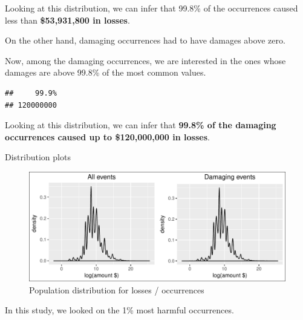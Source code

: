\documentclass[]{article}
\begin{document}
Looking at this distribution, we can infer that 99.8\% of the
occurrences caused less than \textbf{\$53,931,800 in losses}.

On the other hand, damaging occurrences had to have damages above zero.

Now, among the damaging occurrences, we are interested in the ones whose
damages are above 99.8\% of the most common values.

\begin{verbatim}
##     99.9% 
## 120000000
\end{verbatim}

Looking at this distribution, we can infer that \textbf{99.8\% of the
damaging occurrences caused up to \$120,000,000 in losses}.

Distribution plots

\begin{figure}[htbp]
\centering
\includegraphics{readme_files/figure-latex/crop-distribution-1.pdf}
\caption{Population distribution for losses / occurrences}
\end{figure}

In this study, we looked on the 1\% most harmful occurrences.
\end{document}
